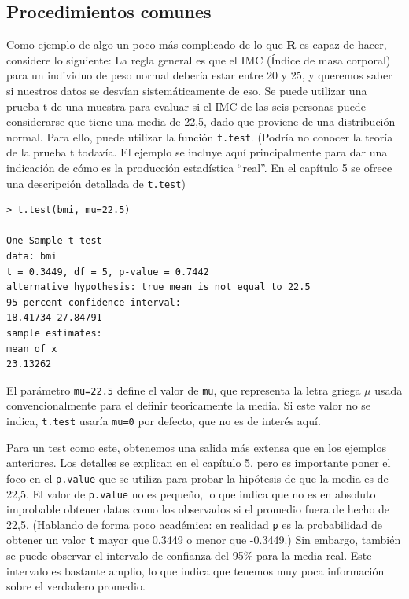 \documentclass[spanish]{extbook}
\numberwithin{equation}{section}
\numberwithin{figure}{section}
\begin{document}
\subsection{Procedimientos comunes}

Como ejemplo de algo un poco más complicado de lo que \textbf{R} es capaz de
hacer, considere lo siguiente: La regla general es que el IMC (Índice de masa
corporal) para un individuo de peso normal debería estar entre 20 y 25, y
queremos saber si nuestros datos se desvían sistemáticamente de eso. Se puede
utilizar una prueba t de una muestra para evaluar si el IMC de las seis
personas puede considerarse que tiene una media de 22,5, dado que proviene de
una distribución normal. Para ello, puede utilizar la función \texttt{t.test}.
(Podría no conocer la teoría de la prueba t todavía. El ejemplo se incluye aquí
principalmente para dar una indicación de cómo es la producción estadística
``real''. En el capítulo 5 se ofrece una descripción detallada de
\texttt{t.test})

\begin{lstlisting}[style=R]
> t.test(bmi, mu=22.5)

One Sample t-test
data: bmi
t = 0.3449, df = 5, p-value = 0.7442
alternative hypothesis: true mean is not equal to 22.5
95 percent confidence interval:
18.41734 27.84791
sample estimates:
mean of x
23.13262
\end{lstlisting}

El parámetro \texttt{mu=22.5} define el valor de \texttt{mu}, que representa la
letra griega $\mu$ usada convencionalmente para el definir teoricamente la
media. Si este valor no se indica, \texttt{t.test} usaría  \texttt{mu=0} por
defecto, que no es de interés aquí.  

Para un test como este, obtenemos una salida más extensa que en los ejemplos
anteriores. Los detalles se explican en el capítulo 5, pero es importante poner
el foco en el \texttt{p.value} que se utiliza para probar la hipótesis de que
la media es de 22,5. El valor de \texttt{p.value} no es pequeño, lo que indica
que no es en absoluto improbable obtener datos como los observados si el
promedio fuera de hecho de 22,5. (Hablando de forma poco académica: en realidad
\texttt{p} es la probabilidad de obtener un valor \texttt{t} mayor que 0.3449 o
menor que -0.3449.) Sin embargo, también se puede observar el intervalo de
confianza del 95\% para la media real. Este intervalo es bastante amplio, lo que
indica que tenemos muy poca información sobre el verdadero promedio.
\newpage
\end{document}

